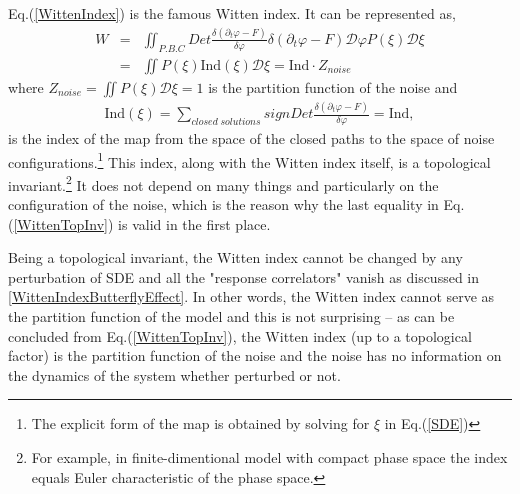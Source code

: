 \documentclass[final,5p,10pt,times,twocolumn,year]{elsarticle}
\begin{document}
Eq.(\ref{WittenIndex}) is the famous Witten index. It can be represented as,
\begin{eqnarray}
        W &=& \iint_{P.B.C} Det \frac{\delta(\partial_t \varphi - F)}{\delta \varphi} \delta(\partial_t \varphi - F) \mathcal{D}\varphi P(\xi) \mathcal{D}\xi \nonumber \\ 
        &=& \iint P(\xi) \text{Ind}(\xi) \mathcal{D}\xi =  \text{Ind}\cdot Z_{noise}\label{WittenTopInv}
\end{eqnarray}
where $Z_{noise}=\iint P(\xi) \mathcal{D}\xi=1$ is the partition function of the noise and
\begin{eqnarray}
\text{Ind}(\xi)  = \sum_{closed\;solutions} sign Det \frac{\delta(\partial_t \varphi - F)}{\delta \varphi}= \text{Ind}\label{index},
\end{eqnarray}
is the index of the map from the space of the closed paths to the space of noise configurations.\footnote{The explicit form of the map is obtained by solving for $\xi$ in Eq.(\ref{SDE})} This index, along with the Witten index itself, is a topological invariant.\footnote{For example, in finite-dimentional model with compact phase space the index equals Euler characteristic of the phase space.} It does not depend on many things and particularly on the configuration of the noise, which is the reason why the last equality in Eq.(\ref{WittenTopInv}) is valid in the first place.

Being a topological invariant, the Witten index cannot be changed by any perturbation of SDE and all the "response correlators" vanish as discussed in \ref{WittenIndexButterflyEffect}. In other words, the Witten index cannot serve as the partition function of the model and this is not surprising -- as can be concluded from Eq.(\ref{WittenTopInv}), the Witten index (up to a topological factor) is the partition function of the noise and the noise has no information on the dynamics of the system whether perturbed or not. 
\end{document}
